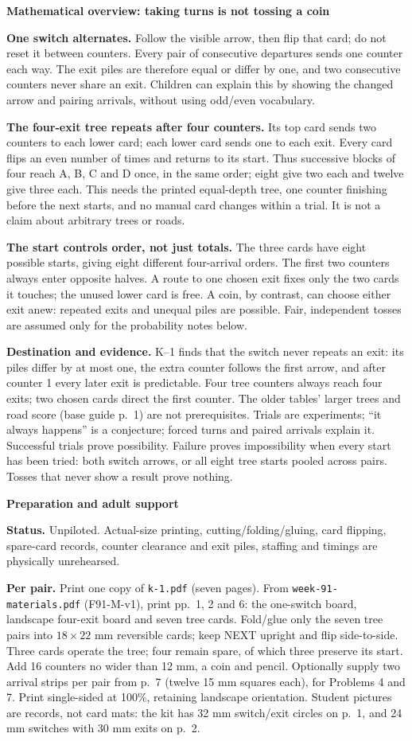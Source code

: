 \documentclass[11pt]{article}
\newcommand{\head}[1]{\par\textbf{\large #1}\par}
\newcommand{\code}[1]{\texttt{#1}}
\begin{document}
\head{Mathematical overview: taking turns is not tossing a coin}
\textbf{One switch alternates.} Follow the visible arrow, then flip that card; do not reset it between counters. Every pair of consecutive departures sends one counter each way. The exit piles are therefore equal or differ by one, and two consecutive counters never share an exit. Children can explain this by showing the changed arrow and pairing arrivals, without using odd/even vocabulary.

\textbf{The four-exit tree repeats after four counters.} Its top card sends two counters to each lower card; each lower card sends one to each exit. Every card flips an even number of times and returns to its start. Thus successive blocks of four reach A, B, C and D once, in the same order; eight give two each and twelve give three each. This needs the printed equal-depth tree, one counter finishing before the next starts, and no manual card changes within a trial. It is not a claim about arbitrary trees or roads.

\textbf{The start controls order, not just totals.} The three cards have eight possible starts, giving eight different four-arrival orders. The first two counters always enter opposite halves. A route to one chosen exit fixes only the two cards it touches; the unused lower card is free. A coin, by contrast, can choose either exit anew: repeated exits and unequal piles are possible. Fair, independent tosses are assumed only for the probability notes below.

\textbf{Destination and evidence.} K--1 finds that the switch never repeats an exit: its piles differ by at most one, the extra counter follows the first arrow, and after counter 1 every later exit is predictable. Four tree counters always reach four exits; two chosen cards direct the first counter. The older tables' larger trees and road score (base guide p.\ 1) are not prerequisites. Trials are experiments; ``it always happens'' is a conjecture; forced turns and paired arrivals explain it. Successful trials prove possibility. Failure proves impossibility when every start has been tried: both switch arrows, or all eight tree starts pooled across pairs. Tosses that never show a result prove nothing.

\head{Preparation and adult support}
\textbf{Status.} Unpiloted. Actual-size printing, cutting/folding/gluing, card flipping, spare-card records, counter clearance and exit piles, staffing and timings are physically unrehearsed.

\textbf{Per pair.} Print one copy of \code{k-1.pdf} (seven pages). From \code{week-91-materials.pdf} (F91-M-v1), print pp.\ 1, 2 and 6: the one-switch board, landscape four-exit board and seven tree cards. Fold/glue only the seven tree pairs into $18\times22$ mm reversible cards; keep NEXT upright and flip side-to-side. Three cards operate the tree; four remain spare, of which three preserve its start. Add 16 counters no wider than 12 mm, a coin and pencil. Optionally supply two arrival strips per pair from p.\ 7 (twelve 15 mm squares each), for Problems 4 and 7. Print single-sided at 100\%, retaining landscape orientation. Student pictures are records, not card mats: the kit has 32 mm switch/exit circles on p.\ 1, and 24 mm switches with 30 mm exits on p.\ 2.
\end{document}
